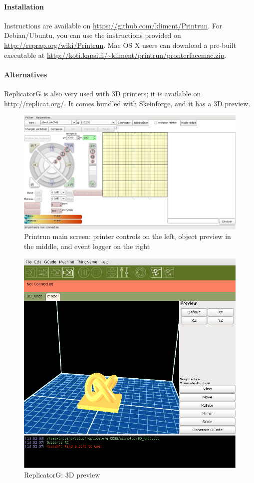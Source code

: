 \documentclass{article}
\begin{document}
	\paragraph{Installation} Instructions are available on \url{https://github.com/kliment/Printrun}. For Debian/Ubuntu, you can use the instructions provided on \url{http://reprap.org/wiki/Printrun}. Mac OS X users can download a pre-built executable at \url{http://koti.kapsi.fi/~kliment/printrun/pronterfacemac.zip}.

	\paragraph{Alternatives} ReplicatorG is also very used with 3D printers; it is available on \url{http://replicat.org/}. It comes bundled with Skeinforge, and it has a 3D preview.

	\begin{figure}[h!]
		\centering
		\includegraphics[width=0.7\linewidth]{printrun.png}
		\caption{Printrun main screen: printer controls on the left, object preview in the middle, and event logger on the right}
	\end{figure}

	\begin{figure}[h!]
		\centering
		\includegraphics[width=0.5\linewidth]{replicatorg.png}
		\caption{ReplicatorG: 3D preview}
	\end{figure}
\end{document}

